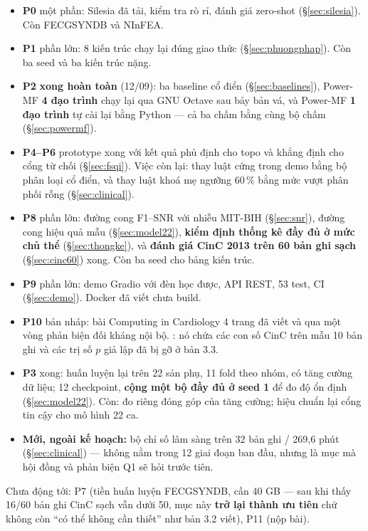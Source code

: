 \begin{ghichu}[title={Những phase đã được kéo lên làm sớm trong đợt thực thi ngày 10--11/09/2026}]
\begin{itemize}[leftmargin=1.4em,itemsep=2pt]
\item \textbf{P0} một phần: Silesia đã tải, kiểm tra rò rỉ, đánh giá zero-shot (\S\ref{sec:silesia}).
Còn FECGSYNDB và NInFEA.
\item \textbf{P1} phần lớn: 8 kiến trúc chạy lại đúng giao thức (\S\ref{sec:phuongphap}). Còn ba seed và
ba kiến trúc nặng.
\item \textbf{P2} \textbf{xong hoàn toàn} (12/09): ba baseline cổ điển (\S\ref{sec:baselines}),
Power-MF \textbf{4 đạo trình} chạy lại qua GNU Octave sau bảy bản vá, và Power-MF \textbf{1 đạo trình}
tự cài lại bằng Python --- cả ba chấm bằng cùng bộ chấm (\S\ref{sec:powermf}).
\item \textbf{P4--P6} prototype xong với kết quả phủ định cho topo và khẳng định cho cổng từ chối
(\S\ref{sec:fsqi}). Việc còn lại: thay luật cứng trong demo bằng bộ phân loại cổ điển, và thay luật khoá
mẹ ngưỡng 60\,\% bằng mức vượt phân phối rỗng (\S\ref{sec:clinical}).
\item \textbf{P8} phần lớn: đường cong F1--SNR với nhiễu MIT-BIH (\S\ref{sec:snr}), đường cong hiệu quả
mẫu (\S\ref{sec:model22}), \textbf{kiểm định thống kê đầy đủ ở mức chủ thể} (\S\ref{sec:thongke}), và
\textbf{đánh giá CinC 2013 trên 60 bản ghi sạch} (\S\ref{sec:cinc60}) xong. Còn ba seed cho bảng
kiến trúc.
\item \textbf{P9} phần lớn: demo Gradio với đèn học được, API REST, 53 test, CI (\S\ref{sec:demo}). Docker
đã viết chưa build.
\item \textbf{P10} bản nháp: bài Computing in Cardiology 4 trang đã viết và qua một vòng phản biện đối
kháng nội bộ. : nó chứa các con số CinC trên mẫu 10 bản ghi và các
trị số $p$ giả lập đã bị gỡ ở bản 3.3.
\item \textbf{P3} xong: huấn luyện lại trên 22 sản phụ, 11 fold theo nhóm, có tăng cường dữ liệu;
12 checkpoint, \textbf{cộng một bộ đầy đủ ở seed 1} để đo độ ổn định (\S\ref{sec:model22}). Còn: đo
riêng đóng góp của tăng cường; hiệu chuẩn lại cổng tin cậy cho mô hình 22 ca.
\item \textbf{Mới, ngoài kế hoạch:} bộ chỉ số lâm sàng trên 32 bản ghi / 269,6 phút
(\S\ref{sec:clinical}) --- không nằm trong 12 giai đoạn ban đầu, nhưng là mục mà hội đồng và phản biện
Q1 sẽ hỏi trước tiên.
\end{itemize}
Chưa động tới: P7 (tiền huấn luyện FECGSYNDB, cần 40 GB --- sau khi thấy 16/60 bản ghi CinC sạch vẫn dưới 50,
mục này \textbf{trở lại thành ưu tiên} chứ không còn ``có thể không cần thiết'' như bản 3.2 viết),
P11 (nộp bài).
\end{ghichu}


